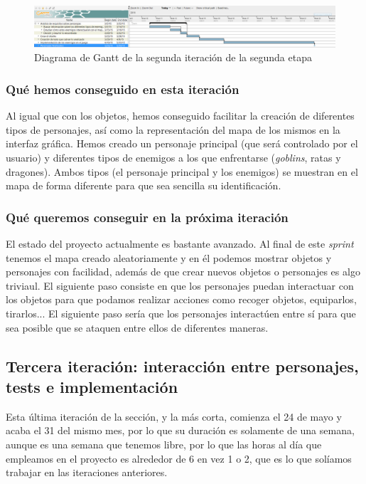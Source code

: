 \begin{figure}
    \includegraphics[width=\textwidth,height=\textheight,keepaspectratio]{./img/sec2it2.png}
  \caption{Diagrama de Gantt de la segunda iteración de la segunda etapa}
  \label{fig:sec2it2}
\end{figure}

\subsubsection{Qué hemos conseguido en esta iteración}

Al igual que con los objetos, hemos conseguido facilitar la creación de diferentes tipos de personajes, así como la representación del mapa de los mismos en la interfaz gráfica. 
Hemos creado un personaje principal (que será controlado por el usuario) y diferentes tipos de enemigos a los que enfrentarse (\textit{goblins}, ratas y dragones). Ambos tipos (el personaje principal y los enemigos) se muestran en el mapa de forma diferente para que sea sencilla su identificación.

\subsubsection{Qué queremos conseguir en la próxima iteración}

El estado del proyecto actualmente es bastante avanzado. Al final de este \textit{sprint} tenemos el mapa creado aleatoriamente y en él podemos mostrar objetos y personajes con facilidad, además de que crear nuevos objetos o personajes es algo triviaul. El siguiente paso consiste en que los personajes puedan interactuar con los objetos para que podamos realizar acciones como recoger objetos, equiparlos, tirarlos... El siguiente paso sería que los personajes interactúen entre sí para que sea posible que se ataquen entre ellos de diferentes maneras.

\subsection{Tercera iteración: interacción entre personajes, tests e implementación}

Esta última iteración de la sección, y la más corta, comienza el 24 de mayo y acaba el 31 del mismo mes, por lo que su duración es solamente de una semana, aunque es una semana que tenemos libre, por lo que las horas al día que empleamos en el proyecto es alrededor de 6 en vez 1 o 2, que es lo que solíamos trabajar en las iteraciones anteriores.

